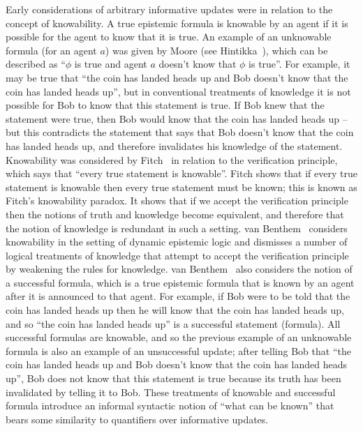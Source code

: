 Early considerations of arbitrary informative updates were in relation to the concept of knowability.
A true epistemic formula is knowable by an agent if it is possible for the agent to know that it is true.
An example of an unknowable formula (for an agent $a$) was given by Moore (see Hintikka~\cite{hintikka:1962}), which can be described as ``$\phi$ is true and agent $a$ doesn't know that $\phi$ is true''.
For example, it may be true that ``the coin has landed heads up and Bob doesn't know that the coin has landed heads up'', but in conventional treatments of knowledge it is not possible for Bob to know that this statement is true.
If Bob knew that the statement were true, then Bob would know that the coin has landed heads up -- but this contradicts the statement that says that Bob doesn't know that the coin has landed heads up, and therefore invalidates his knowledge of the statement. 
Knowability was considered by Fitch~\cite{fitch:1963} in relation to the verification principle, which says that ``every true statement is knowable''.
Fitch shows that if every true statement is knowable then every true statement must be known; this is known as Fitch's knowability paradox.
It shows that if we accept the verification principle then the notions of truth and knowledge become equivalent, and therefore that the notion of knowledge is redundant in such a setting.
van Benthem~\cite{vanbenthem:2004} considers knowability in the setting of dynamic epistemic logic and dismisses a number of logical treatments of knowledge that attempt to accept the verification principle by weakening the rules for knowledge.
van Benthem~\cite{vanbenthem:2004} also considers the notion of a successful formula, which is a true epistemic formula that is known by an agent after it is announced to that agent.
For example, if Bob were to be told that the coin has landed heads up then he will know that the coin has landed heads up, and so ``the coin has landed heads up'' is a successful statement (formula).
All successful formulas are knowable, and so the previous example of an unknowable formula is also an example of an unsuccessful update; after telling Bob that ``the coin has landed heads up and Bob doesn't know that the coin has landed heads up'', Bob does not know that this statement is true because its truth has been invalidated by telling it to Bob.
These treatments of knowable and successful formula introduce an informal syntactic notion of ``what can be known'' that bears some similarity to quantifiers over informative updates.

